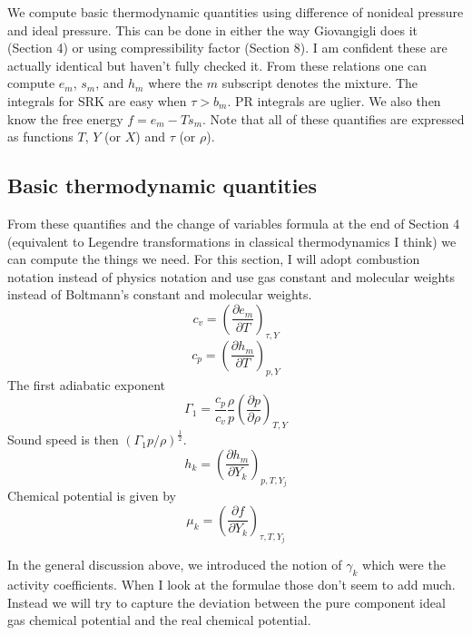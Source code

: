 \documentclass[11pt]{article}
\newcommand{\half}{\frac{1}{2}}
\begin{document}
We compute basic thermodynamic quantities using difference of nonideal pressure and ideal pressure.
This can be done in either the way Giovangigli does it (Section 4) or using compressibility factor (Section 8).
I am confident these are actually identical but haven't fully checked it.
From these relations one can compute $e_m$, $s_m$, and $h_m$ where the $m$ subscript denotes the mixture.
The integrals for SRK are easy when $\tau > b_m$.  PR integrals are uglier.
We also then know the free energy $f = e_m - T s_m$.
Note that all of these quantifies are expressed as functions $T$, $Y$ (or $X$) and $\tau$ (or $\rho$).

\subsection{Basic thermodynamic quantities}

From these quantifies and the change of variables formula at the end of Section 4 (equivalent to Legendre
transformations in classical thermodynamics I think) we can compute the things we need.
For this section, I will adopt combustion notation instead of physics notation and use gas constant
and molecular weights instead of Boltmann's constant and molecular weights.  
\[
c_v = \left( \frac{\partial e_m}{\partial T}\right)_{\tau,Y}
\]
\[
c_p = \left( \frac{\partial h_m}{\partial T}\right)_{p,Y}
\]
The first adiabatic exponent
\[
\Gamma_1 = \frac{c_p}{c_v} \frac{\rho}{p} 
\left( \frac{\partial p}{\partial \rho}\right)_{T,Y}
\]
Sound speed is then $(\Gamma_1 p / \rho)^\half$.
\[
h_k = \left( \frac{\partial h_m}{\partial Y_k}\right)_{p,T,Y_j}
\]
Chemical potential is given by
\[
\mu_k = \left( \frac{\partial f}{\partial Y_k}\right)_{\tau,T,Y_j}
\]

In the general discussion above, we introduced the notion of $\gamma_k$ which were the activity coefficients.
When I look at the formulae those don't seem to add much.
Instead we will try to capture the deviation between the pure component ideal gas chemical potential and
the real chemical potential.
\end{document}

